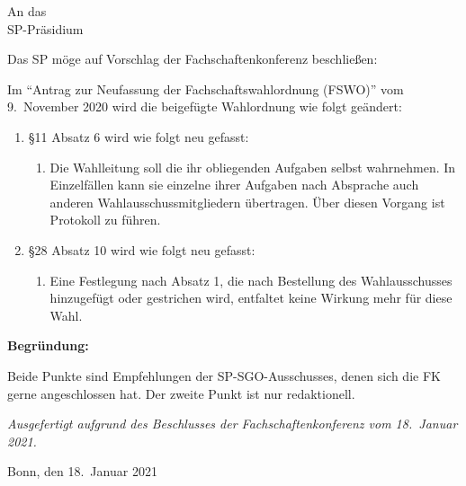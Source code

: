 \documentclass[DIV=12, parskip=half, fontsize=12pt, a4paper,fromlogo,%
foldmarks=off,pagenumber=no%
]{scrlttr2}
\begin{document}
\begin{letter}
	{An das\\
	SP-Präsidium}

  \opening{Das SP möge auf Vorschlag der Fachschaftenkonferenz beschließen:}

  \begin{linenumbers}
    Im \enquote{Antrag zur Neufassung der Fachschaftswahlordnung (FSWO)} vom 9.\ November 2020 wird die beigefügte Wahlordnung  wie folgt geändert:

    \begin{enumerate}[1.]
    	\item \S 11 Absatz 6 wird wie folgt neu gefasst:
    		\begin{enumerate}[(1)] \ttfamily
    		\setcounter{enumii}{5}
    		\item Die Wahlleitung soll die ihr obliegenden Aufgaben selbst wahrnehmen.
    			In Einzelfällen kann sie einzelne ihrer Aufgaben nach Absprache auch anderen Wahlausschussmitgliedern übertragen.
    		Über diesen Vorgang ist Protokoll zu führen.
    		\end{enumerate}
    	\item \S 28 Absatz 10 wird wie folgt neu gefasst:
    		\begin{enumerate}[(1)] \ttfamily
	    		\setcounter{enumii}{9}
	    		\item Eine Festlegung nach Absatz 1, die nach Bestellung des Wahlausschusses hinzugefügt oder gestrichen wird,
	    			entfaltet keine Wirkung mehr für diese Wahl.
	    	\end{enumerate}
    \end{enumerate}
  \end{linenumbers}

\vspace{1em}
\textbf{Begründung:}\par
Beide Punkte sind Empfehlungen der SP-SGO-Ausschusses, denen sich die FK gerne angeschlossen hat.
Der zweite Punkt ist nur redaktionell.

  \vspace{1em}
  \textit{Ausgefertigt aufgrund des Beschlusses der Fachschaftenkonferenz vom 18.\ Januar 2021.}

  \closing{Bonn, den 18.\ Januar 2021 }

\end{letter}
\end{document}
